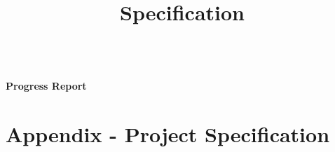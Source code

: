 \documentclass[a4paper,fleqn,12pt]{article}
\begin{document}
\pagestyle{plain}


\begin{center}
    \\
    \vspace{1.5em}
    \textbf{\Large{Progress Report}}\\
    \vspace{1em}
\end{center}







\newpage
\title{Specification}
\section{Appendix - Project Specification}





\printbibliography
\end{document}
